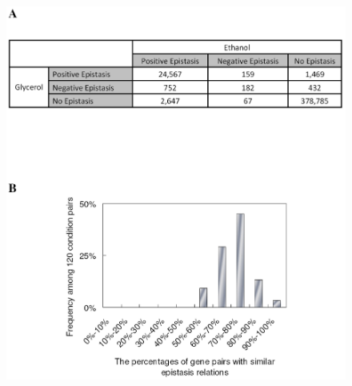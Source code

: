 \documentclass[compress]{beamer}
\begin{document}
{\begin{figure}
  \includegraphics[width=\textwidth, viewport=0 325 405 410, clip=true]
  {envFigure_2}
\end{figure}
}

\end{document}
